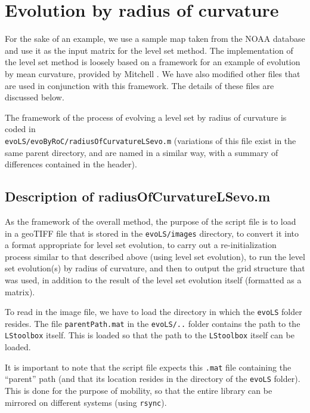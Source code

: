 \documentclass{article}
\begin{document}
\section{Evolution by radius of curvature}
\label{sec:level-set-evolution}

For the sake of an example, we use a sample map taken from the
NOAA database \cite{etopo1} and use it as the input matrix for the
level set method. The implementation of the level set method is
loosely based on a framework for an example of evolution by mean
curvature, provided by Mitchell \cite{toolboxls, mitchell}. We have also
modified other files that are used in conjunction with this
framework. The details of these files are discussed below. 

The framework of the process of evolving a level set by radius of
curvature is coded in\\
\texttt{evoLS/evoByRoC/radiusOfCurvatureLSevo.m} (variations of
this file exist in the same parent directory, and are named in a
similar way, with a summary of differences contained in the
header). 

\subsection{Description of radiusOfCurvatureLSevo.m}
\label{sec:descr-radi}

As the framework of the overall method, the purpose of the script
file is to load in a geoTIFF file that is stored in the
\texttt{evoLS/images} directory, to convert it into a format
appropriate for level set evolution, to carry out a
re-initialization process similar to that described above (using
level set evolution), to run the level set evolution(s) by radius
of curvature, and then to output the grid structure that was used,
in addition to the result of the level set evolution itself
(formatted as a matrix).






To read in the image file, we have to load the directory in which
the \texttt{evoLS} folder resides. The file
\texttt{parentPath.mat} in the \texttt{evoLS/..} folder contains
the path to the \texttt{LStoolbox} itself. This is loaded so that
the path to the \texttt{LStoolbox} itself can be loaded.

It is important to note that the script file expects this
\texttt{.mat} file containing the ``parent'' path (and that its
location resides in the directory of the \texttt{evoLS}
folder). This is done for the purpose of mobility, so that the
entire library can be mirrored on different systems (\eg using
\texttt{rsync}).
\clearpage

\end{document}

